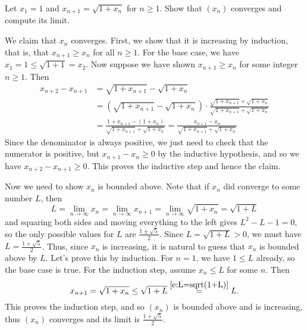 \documentclass[11pt,dvipsnames]{book}
\numberwithin{equation}{section} %
\numberwithin{figure}{section} %
\numberwithin{table}{section} %
\begin{document}
\begin{exercise}
 Let $x_{1}=1$ and $x_{n+1}=\sqrt{1+x_{n}}$ for $n \geq 1$. Show that $(x_n)$ converges and compute its limit.

\begin{solution}
We claim that $x_n$ converges. First, we show that it is increasing by induction, that is, that $x_{n+1}\geq x_{n}$ for all $n\geq 1$. For the base case, we have $x_{1}=1\leq \sqrt{1+1}=x_{2}$. Now suppose we have shown  $x_{n+1}\geq x_{n}$ for some integer $n\geq 1$. Then
\begin{align*}
x_{n+2} -x_{n+1} 
& =\sqrt{1+x_{n+1}}-\sqrt{1+x_{n}}\\
& = \left(\sqrt{1+x_{n+1}}-\sqrt{1+x_{n}}\right)\cdot\frac{\sqrt{1+x_{n+1}}+\sqrt{1+x_{n}}}{\sqrt{1+x_{n+1}}+\sqrt{1+x_{n}}}\\
& = \frac{1+x_{n+1}-(1+x_{n})}{\sqrt{1+x_{n+1}}+\sqrt{1+x_{n}}}
 = \frac{x_{n+1}-x_{n}}{\sqrt{1+x_{n+1}}+\sqrt{1+x_{n}}}
\end{align*}
Since the denominator is always positive, we just need to check that the numerator is positive, but $x_{n+1}-x_{n}\geq 0$ by the inductive hypothesis, and so we have $x_{n+2} -x_{n+1} \geq 0 $. This proves the inductive step and hence the claim. 

Now we need to show $x_n$ is bounded above. Note that if $x_n$ did converge to some number $L$, then
\begin{equation}
\label{e:L=sqrt(1+L)}
L=\lim_{n\rightarrow\infty}x_{n}
=\lim_{n\rightarrow\infty}x_{n+1}
=\lim_{n\rightarrow\infty}\sqrt{1+x_{n}}
=\sqrt{1+L}
\end{equation}
and squaring both sides and moving everything to the left gives $L^2-L-1=0$, so the only possible values for $L$ are $\frac{1\pm\sqrt{5}}{2}$. Since $L=\sqrt{1+L}> 0$, we must have $L=\frac{1+\sqrt{5}}{2}$. Thus, since $x_n$ is increasing, it is natural to guess that $x_n$ is bounded above by $L$. Let's prove this by induction. For $n=1$, we have $1\leq L$ already, so the base case is true. For the induction step, assume $x_{n}\leq L$ for some $n$. Then
\[
x_{n+1}=\sqrt{1+x_{n}}\leq \sqrt{1+L}\stackrel{\eqref{e:L=sqrt(1+L)}}{=}L.\]
This proves the induction step, and so $(x_n)$ is bounded above and is increasing, thus $(x_n)$ converges and its limit is $\frac{1+\sqrt{5}}{2}$. 
\end{solution}

\end{exercise}
\end{document}
